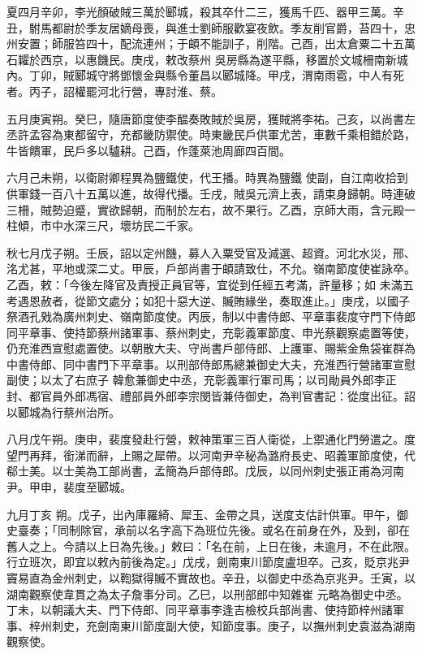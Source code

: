 \begin{pinyinscope}
 夏四月辛卯，李光顏破賊三萬於郾城，殺其卒什二三，獲馬千匹、器甲三萬。辛丑，駙馬都尉於季友居嫡母喪，與進士劉師服歡宴夜飲。季友削官爵，苔四十，忠州安置；師服笞四十，配流連州；于頔不能訓子，削階。己酉，出太倉粟二十五萬石糶於西京，以惠饑民。庚戌，敕改蔡州
 吳房縣為遂平縣，移置於文城柵南新城內。丁卯，賊郾城守將鄧懷金與縣令董昌以郾城降。甲戌，渭南雨雹，中人有死者。丙子，詔權罷河北行營，專討淮、蔡。



 五月庚寅朔。癸巳，隨唐節度使李醖奏敗賊於吳房，獲賊將李祐。己亥，以尚書左丞許孟容為東都留守，充都畿防禦使。時東畿民戶供軍尤苦，車數千乘相錯於路，牛皆饋軍，民戶多以驢耕。己酉，作蓬萊池周廊四百間。



 六月己未朔，以衛尉卿程異為鹽鐵使，代王播。時異為鹽鐵
 使副，自江南收拾到供軍錢一百八十五萬以進，故得代播。壬戌，賊吳元濟上表，請束身歸朝。時連破三柵，賊勢迫蹙，實欲歸朝，而制於左右，故不果行。乙酉，京師大雨，含元殿一柱傾，市中水深三尺，壞坊民二千家。



 秋七月戊子朔。壬辰，詔以定州饑，募人入粟受官及減選、超資。河北水災，邢、洺尤甚，平地或深二丈。甲辰，戶部尚書于頔請致仕，不允。嶺南節度使崔詠卒。乙酉，敕：「今後左降官及責授正員官等，宜從到任經五考滿，許量移；如
 未滿五考遇恩赦者，從節文處分；如犯十惡大逆、贓賄緣坐，奏取進止。」庚戌，以國子祭酒孔戣為廣州刺史、嶺南節度使。丙辰，制以中書侍郎、平章事裴度守門下侍郎同平章事、使持節蔡州諸軍事、蔡州刺史，充彰義軍節度、申光蔡觀察處置等使，仍充淮西宣慰處置使。以朝散大夫、守尚書戶部侍郎、上護軍、賜紫金魚袋崔群為中書侍郎、同中書門下平章事。以刑部侍郎馬總兼御史大夫，充淮西行營諸軍宣慰副使；以太了右庶子
 韓愈兼御史中丞，充彰義軍行軍司馬；以司勛員外郎李正封、都官員外郎馮宿、禮部員外郎李宗閔皆兼侍御史，為判官書記：從度出征。詔以郾城為行蔡州治所。



 八月戊午朔。庚申，裴度發赴行營，敕神策軍三百人衛從，上禦通化門勞遣之。度望門再拜，銜涕而辭，上賜之犀帶。以河南尹辛秘為潞府長史、昭義軍節度使，代郗士美。以士美為工部尚書，孟簡為戶部侍郎。戊辰，以同州刺史張正甫為河南尹。甲申，裴度至郾城。



 九月丁亥
 朔。戊子，出內庫羅綺、犀玉、金帶之具，送度支估計供軍。甲午，御史臺奏；「同制除官，承前以名字高下為班位先後。或名在前身在外，及到，卻在舊人之上。今請以上日為先後。」敕曰：「名在前，上日在後，未逾月，不在此限。行立班次，即宜以敕內前後為定。」戊戌，劍南東川節度盧坦卒。己亥，貶京兆尹竇易直為金州刺史，以鞫獄得贓不實故也。辛丑，以御史中丞為京兆尹。壬寅，以湖南觀察使韋貫之為太子詹事分司。乙巳，以刑部郎中知雜崔
 元略為御史中丞。丁未，以朝議大夫、門下侍郎、同平章事李逢吉檢校兵部尚書、使持節梓州諸軍事、梓州刺史，充劍南東川節度副大使，知節度事。庚子，以撫州刺史袁滋為湖南觀察使。




\end{pinyinscope}

